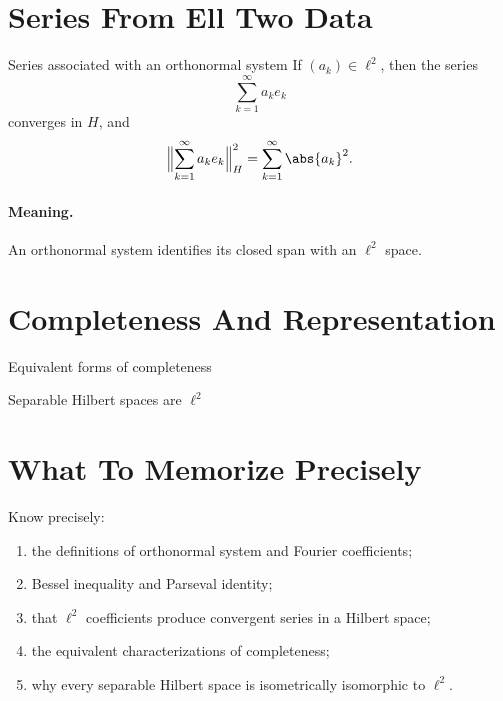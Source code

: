 \documentclass[11pt]{article}
\begin{document}
\section{Series From Ell Two Data}

\begin{thmbox}{Series associated with an orthonormal system}
If $(a_k)\in \ell^2$, then the series
\[
\sum_{k=1}^{\infty}a_ke_k
\]
converges in $H$, and
\[
\Bigl\|\sum_{k=1}^{\infty}a_ke_k\Bigr\|_H^2=\sum_{k=1}^{\infty}\abs{a_k}^2.
\]
\end{thmbox}

\paragraph{Meaning.}
An orthonormal system identifies its closed span with an $\ell^2$ space.

\section{Completeness And Representation}

\begin{thmbox}{Equivalent forms of completeness}
\thmOrthonormalCompleteEquiv
\end{thmbox}

\begin{thmbox}{Separable Hilbert spaces are $\ell^2$}
\thmSeparableHilbertONB

\medskip

\thmSeparableHilbertIsomorphicEllTwo
\end{thmbox}

\section{What To Memorize Precisely}

\begin{focusbox}
Know precisely:
\begin{enumerate}
\item the definitions of orthonormal system and Fourier coefficients;
\item Bessel inequality and Parseval identity;
\item that $\ell^2$ coefficients produce convergent series in a Hilbert space;
\item the equivalent characterizations of completeness;
\item why every separable Hilbert space is isometrically isomorphic to $\ell^2$.
\end{enumerate}
\end{focusbox}
\end{document}
